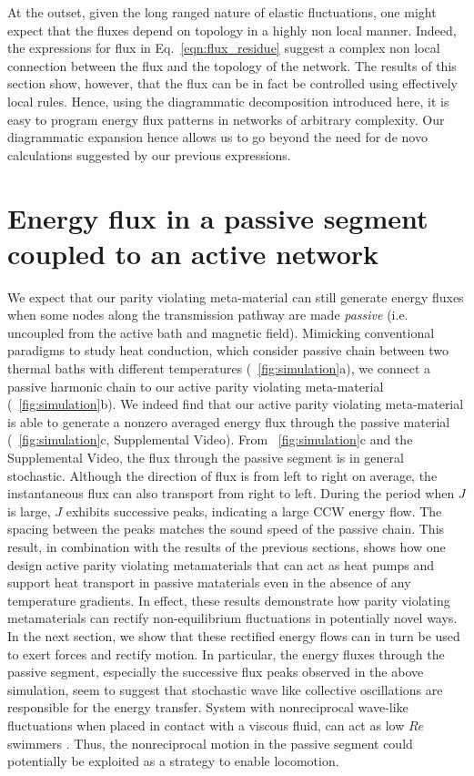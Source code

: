 \documentclass[
 preprint,
 preprintnumbers,
 amsmath,amssymb,
 aps,
 pre,
 longbibliography,
 superscriptaddress,
 10pt, twocolumn
]{revtex4-1}
\begin{document}
At the outset, given the long ranged nature of elastic fluctuations, one might expect that the fluxes depend on topology in a highly non local manner. Indeed, the expressions for flux in Eq.~\ref{eqn:flux_residue} suggest a complex non local connection between the flux and the topology of the network. The results of this section show, however, that the flux can be in fact be controlled using effectively local rules. Hence, using the diagrammatic decomposition introduced here, it is easy to program energy flux patterns in networks of arbitrary complexity. Our diagrammatic expansion hence allows us to go beyond the need for de novo calculations suggested by our previous expressions.

\section{Energy flux in a passive segment coupled to an active network}
\label{sec:passiveflux}
We expect that our parity violating meta-material can still generate energy fluxes when some nodes along the transmission pathway are made {\it passive} (i.e. uncoupled from the active bath and magnetic field).
Mimicking conventional paradigms to study heat conduction, which consider passive chain between two thermal baths with different temperatures (\figurename~\ref{fig:simulation}a), we connect a passive harmonic chain to our active parity violating meta-material (\figurename~\ref{fig:simulation}b).
We indeed find that our active parity violating meta-material is able to generate a nonzero averaged energy flux through the passive material (\figurename~\ref{fig:simulation}c, Supplemental Video).
From \figurename~\ref{fig:simulation}c and the Supplemental Video, the flux through the passive segment is in general stochastic. Although the direction of flux is from left to right on average, the instantaneous flux can also transport from right to left. During the period when $J$ is large, $J$ exhibits successive peaks, indicating a large CCW energy flow. The spacing between the peaks matches the sound speed of the passive chain. This result, in combination with the results of the previous sections, shows how one design active parity violating metamaterials that can act as heat pumps and support heat transport in passive mataterials even in the absence of any temperature gradients. In effect, these results demonstrate how parity violating metamaterials can rectify non-equilibrium fluctuations in potentially novel ways. In the next section, we show that these rectified energy flows can in turn be used to exert forces and rectify motion. In particular, the energy fluxes through the passive segment, especially the successive flux peaks observed in the above simulation, seem to suggest that stochastic wave like collective oscillations are responsible for the energy transfer. System with nonreciprocal wave-like fluctuations when placed in contact with a viscous fluid, can act as low $Re$ swimmers \cite{Taylor1951AnalysisSwimming,Purcell1977LifeLow,Golestanian2008AnalyticResults}. Thus, the nonreciprocal motion in the passive segment could potentially be exploited as a strategy to enable locomotion. 
\end{document}
